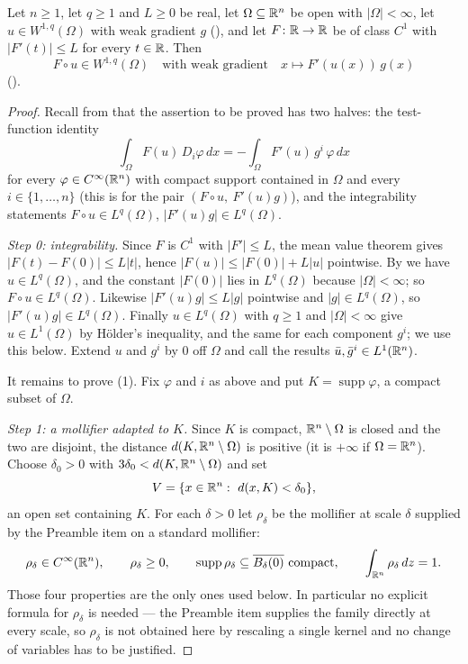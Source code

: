 \begin{lemma}
Let $n\ge1$, let $q\ge1$ and $L\ge0$ be real, let $\Omega\subseteq\mathbb{R}^n$ be open
with $|\Omega|<\infty$, let $u\in W^{1,q}(\Omega)$ with weak gradient $g$
(), and let $F\colon\mathbb{R}\to\mathbb{R}$ be of class $C^1$ with
$|F'(t)|\le L$ for every $t\in\mathbb{R}$.  Then
\[
F\circ u\in W^{1,q}(\Omega)\quad\text{with weak gradient}\quad
x\longmapsto F'(u(x))\,g(x)
\]
().
\end{lemma}
\begin{proof}
Recall from  that the assertion to be proved has two halves:
the test-function identity
\[
\int_\Omega F(u)\,D_i\varphi\,dx=-\int_\Omega F'(u)\,g^i\,\varphi\,dx
\tag{1}
\]
for every $\varphi\in C^\infty(\mathbb{R}^n)$ with compact support contained in
$\Omega$ and every $i\in\{1,\dots,n\}$ (this is  for
the pair $(F\circ u,\ F'(u)g)$), and the integrability statements
$F\circ u\in L^q(\Omega)$, $|F'(u)g|\in L^q(\Omega)$.

\emph{Step 0: integrability.}  Since $F$ is $C^1$ with $|F'|\le L$, the mean
value theorem gives $|F(t)-F(0)|\le L|t|$, hence
$|F(u)|\le|F(0)|+L|u|$ pointwise.  By  we have
$u\in L^q(\Omega)$, and the constant $|F(0)|$ lies in $L^q(\Omega)$ because
$|\Omega|<\infty$; so $F\circ u\in L^q(\Omega)$.  Likewise
$|F'(u)g|\le L|g|$ pointwise and $|g|\in L^q(\Omega)$, so
$|F'(u)g|\in L^q(\Omega)$.  Finally $u\in L^q(\Omega)$ with $q\ge1$ and
$|\Omega|<\infty$ give $u\in L^1(\Omega)$ by H\"older's inequality, and the same
for each component $g^i$; we use this below.  Extend $u$ and $g^i$ by $0$ off
$\Omega$ and call the results $\bar u,\bar g^i\in L^1(\mathbb{R}^n)$.

It remains to prove (1).  Fix $\varphi$ and $i$ as above and put
$K=\operatorname{supp}\varphi$, a compact subset of $\Omega$.

\emph{Step 1: a mollifier adapted to $K$.}  Since $K$ is compact, $\mathbb{R}^n\setminus
\Omega$ is closed and the two are disjoint, the distance
$d(K,\mathbb{R}^n\setminus\Omega)$ is positive (it is $+\infty$ if $\Omega=\mathbb{R}^n$).
Choose $\delta_0>0$ with $3\delta_0<d(K,\mathbb{R}^n\setminus\Omega)$ and set
\[
V=\{x\in\R^n:\ d(x,K)<\delta_0\},
\]
an open set containing $K$.  For each $\delta>0$ let $\rho_\delta$ be the mollifier at scale $\delta$
supplied by the Preamble item on a standard mollifier:
\[
\rho_\delta\in C^\infty(\R^n),\qquad \rho_\delta\ge0,\qquad
\operatorname{supp}\rho_\delta\subseteq\overline{B_\delta(0)}\ \text{compact},
\qquad \int_{\R^n}\rho_\delta\,dz=1 .
\]
Those four properties are the only ones used below.  In particular no explicit
formula for $\rho_\delta$ is needed --- the Preamble item supplies the family
directly at every scale, so $\rho_\delta$ is not obtained here by rescaling a
single kernel and no change of variables has to be justified.


\end{proof}
